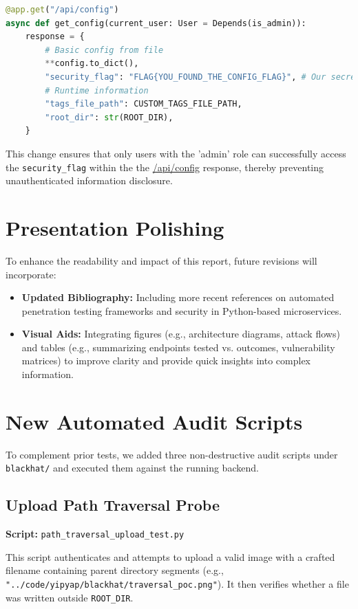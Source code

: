 \documentclass{article}
\begin{document}
\begin{lstlisting}[language=Python, caption=Security Fix in \texttt{app/main.py}]
@app.get("/api/config")
async def get_config(current_user: User = Depends(is_admin)):
    response = {
        # Basic config from file
        **config.to_dict(),
        "security_flag": "FLAG{YOU_FOUND_THE_CONFIG_FLAG}", # Our secret flag
        # Runtime information
        "tags_file_path": CUSTOM_TAGS_FILE_PATH,
        "root_dir": str(ROOT_DIR),
    }
\end{lstlisting}

This change ensures that only users with the 'admin' role can successfully access the \texttt{security\_flag} within the the \url{/api/config} response, thereby preventing unauthenticated information disclosure.




\section{Presentation Polishing}
To enhance the readability and impact of this report, future revisions will incorporate:
\begin{itemize}
    \item \textbf{Updated Bibliography:} Including more recent references on automated penetration testing frameworks and security in Python-based microservices.
    \item \textbf{Visual Aids:} Integrating figures (e.g., architecture diagrams, attack flows) and tables (e.g., summarizing endpoints tested vs. outcomes, vulnerability matrices) to improve clarity and provide quick insights into complex information.
\end{itemize}

\section{New Automated Audit Scripts}
To complement prior tests, we added three non-destructive audit scripts under \texttt{blackhat/} and executed them against the running backend.

\subsection{Upload Path Traversal Probe}
\textbf{Script:} \texttt{path\_traversal\_upload\_test.py}

This script authenticates and attempts to upload a valid image with a crafted filename containing parent directory segments (e.g., \texttt{"../code/yipyap/blackhat/traversal\_poc.png"}). It then verifies whether a file was written outside \texttt{ROOT\_DIR}.
\end{document}
